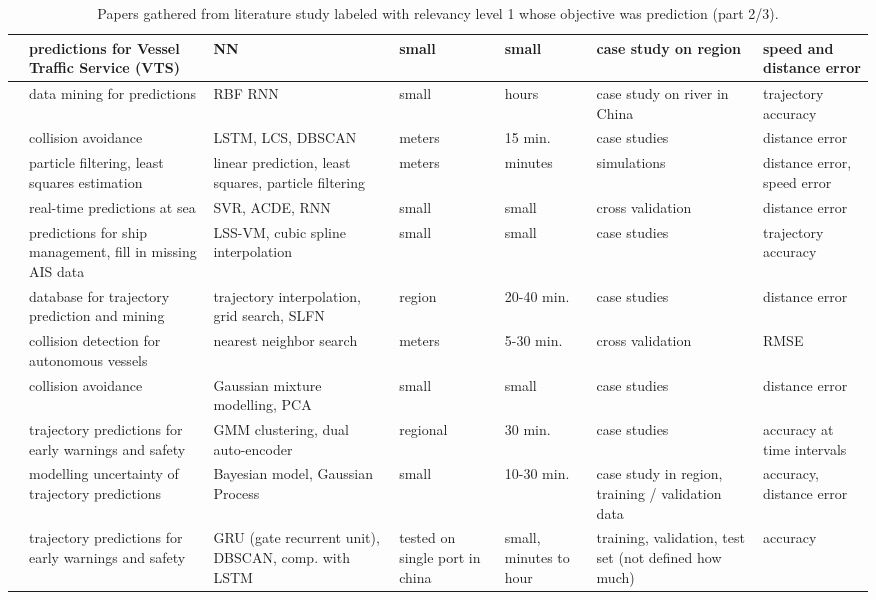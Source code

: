 \noindent
\begin{table}[htbp]
{\small\begin{tabularx}{1.2\textwidth}{p{0.6in} X X X p{0.4in} X p{0.5in}}
    \midrule
    \cite{Kim2018PreprocessingArea} & predictions for Vessel Traffic Service (VTS) & NN & small & small & case study on region & speed and distance error \\ \midrule
    \cite{Li2018ShipMining} & data mining for predictions & RBF RNN & small & hours & case study on river in China & trajectory accuracy \\ \midrule
    \cite{Li2019Long-termData} & collision avoidance & LSTM, LCS, DBSCAN & meters & 15 min. & case studies & distance error \\ \midrule
    \cite{Lian2019ResearchAlgorithm} & particle filtering, least squares estimation & linear prediction, least squares, particle filtering & meters & minutes & simulations & distance error, speed error \\ \midrule
    \cite{Liu2019VesselACDE-SVR} & real-time predictions at sea & SVR, ACDE, RNN & small & small & cross validation & distance error \\ \midrule
    \cite{Liu2020PredictingLearning} & predictions for ship management, fill in missing AIS data & LSS-VM, cubic spline interpolation & small & small & case studies & trajectory accuracy \\ \midrule
    \cite{Mao2018AnMining} & database for trajectory prediction and mining & trajectory interpolation, grid search, SLFN & region & 20-40 min. & case studies & distance error \\ \midrule
    \cite{Murray2018AOperations} & collision detection for autonomous vessels & nearest neighbor search & meters & 5-30 min. & cross validation & RMSE \\ \midrule
    \cite{Murray2019AnVessels} & collision avoidance & Gaussian mixture modelling, PCA & small & small & case studies & distance error \\ \midrule
    \cite{Murray2020AData} & trajectory predictions for early warnings and safety & GMM clustering, dual auto-encoder & regional & 30 min. & case studies & accuracy at time intervals \\ \midrule
    \cite{Rong2019ShipModel} & modelling uncertainty of trajectory predictions & Bayesian model, Gaussian Process & small & 10-30 min. & case study in region, training / validation data & accuracy, distance error \\ \midrule
    \cite{Suo2020ANetwork} & trajectory predictions for early warnings and safety & GRU (gate recurrent unit), DBSCAN, comp. with LSTM & tested on single port in china & small, minutes to hour & training, validation, test set (not defined how much) & accuracy \\ \midrule
\end{tabularx}}
\caption{Papers gathered from literature study labeled with relevancy level 1 whose objective was prediction (part 2/3).}
\label{tab:lit_review_cat_1_2}
\end{table}

